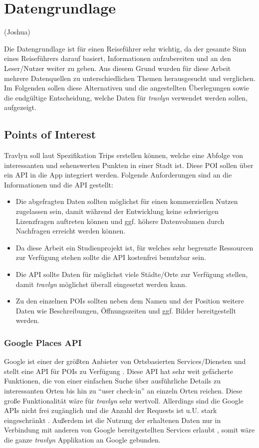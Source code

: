\chapter{Datengrundlage}
(Joshua)

Die Datengrundlage ist für einen Reiseführer sehr wichtig, da der gesamte Sinn eines Reiseführers darauf basiert, Informationen aufzubereiten und an den Leser/Nutzer weiter zu geben. Aus diesem Grund wurden für diese Arbeit mehrere Datenquellen zu unterschiedlichen Themen herausgesucht und verglichen. Im Folgenden sollen diese Alternativen und die angestellten Überlegungen sowie die endgültige Entscheidung, welche Daten für \textit{travlyn} verwendet werden sollen, aufgezeigt.

\section{Points of Interest}
Travlyn soll laut Spezifikation Trips erstellen können, welche eine Abfolge von interessanten und sehenswerten Punkten in einer Stadt ist. Diese \ac{POI} sollen über ein \ac{API} in die App integriert werden. Folgende Anforderungen sind an die Informationen und die API gestellt:

\begin{itemize}
	\item Die abgefragten Daten sollten möglichst für einen kommerziellen Nutzen zugelassen sein, damit während der Entwicklung keine schwierigen Lizenzfragen auftreten können und ggf. höhere Datenvolumen durch Nachfragen erreicht werden können.
	\item Da diese Arbeit ein Studienprojekt ist, für welches sehr begrenzte Ressourcen zur Verfügung stehen sollte die API kostenfrei benutzbar sein.  
	\item Die API sollte Daten für möglichst viele Städte/Orte zur Verfügung stellen, damit \textit{travlyn} möglichst überall eingesetzt werden kann.
	\item Zu den einzelnen POIs sollten neben dem Namen und der Position weitere Daten wie Beschreibungen, Öffnungszeiten und ggf. Bilder bereitgestellt werden.
\end{itemize}

\subsection{Google Places API}
Google ist einer der größten Anbieter von Ortsbasierten Services/Diensten und stellt eine API für POIs zu Verfügung \cite{Google.01.02.2020}. Diese API hat sehr weit gefächerte Funktionen, die von einer einfachen Suche über ausführliche Details zu interessanten Orten bis hin zu \enquote{user check-in} an einzeln Orten reichen. Diese große Funktionalität wäre für \textit{travlyn} sehr wertvoll. Allerdings sind die Google APIs nicht frei zugänglich und die Anzahl der Requests ist u.U. stark eingeschränkt \cite{Singhal.2012}. Außerdem ist die Nutzung der erhaltenen Daten nur in Verbindung mit anderen von Google bereitgestellten Services erlaubt \cite{Google.02.12.2019}, somit wäre die ganze \textit{travlyn} Applikation an Google gebunden.  

